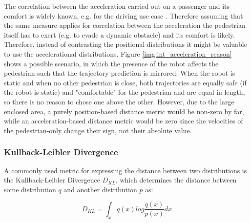The correlation between the acceleration carried out on a passenger and its comfort is widely known, e.g. for the driving use case \cite{Hoberock1976}. Therefore assuming that the same measure applies for correlation between the acceleration the pedestrian itself has to exert (e.g. to evade a dynamic obstacle) and its comfort is likely. Therefore, instead of contrasting the positional distributions it might be valuable to use the accelerational distributions. Figure \ref{img:int_acceleration_reason} shows a possible scenario, in which the presence of the robot affects the pedestrian such that the trajectory prediction is mirrored. When the robot is static and when no other pedestrian is close, both trajectories are equally safe (if the robot is static)  and "comfortable" for the pedestrian and are equal in length, so there is no reason to chose one above the other. However, due to the large enclosed area, a purely position-based distance metric would be non-zero by far, while an acceleration-based distance metric would be zero since the velocities of the pedestrian-only change their sign, not their absolute value.

\subsubsection{Kullback-Leibler Divergence}
A commonly used metric for expressing the distance between two distributions is the Kullback-Leibler Divergence $D_{KL}$, which determines the distance between  some distribution $q$ and another distribution $p$ as:

\begin{equation}
D_{KL} = \int_x q(x) log \frac{q(x)}{p(x)} dx    
\end{equation}

